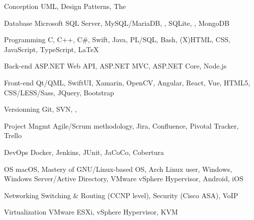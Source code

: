 

\begin{cvskills}

  \cvskill
    {Conception} %
    {UML, Design Patterns, The } %

  \cvskill
    {Database} %
    {Microsoft SQL Server, MySQL/MariaDB, , SQLite, , MongoDB} %

  \cvskill
    {Programming} %
    {C, C++, C\#, Swift, Java, PL/SQL, Bash, (X)HTML, CSS, JavaScript, TypeScript, \LaTeX} %

  \cvskill
    {Back-end} %
    {ASP.NET Web API, ASP.NET MVC, ASP.NET Core, Node.js} %

  \cvskill
    {Front-end} %
    {Qt/QML, SwiftUI, Xamarin, OpenCV, Angular, React, Vue, HTML5, CSS/LESS/Sass, JQuery, Bootstrap} %

  \cvskill
    {Versionning} %
    {Git, SVN, , } %

  \cvskill
    {Project Mngmt} %
    {Agile/Scrum methodology, Jira, Confluence, Pivotal Tracker, Trello} %

  \cvskill
    {DevOps} %
    {Docker, Jenkins, JUnit, JaCoCo, Cobertura} %

  \cvskill
    {OS} %
    {macOS, Mastery of GNU/Linux-based OS, Arch Linux user, Windows, Windows Server/Active Directory, VMware vSphere Hypervisor, Android, iOS} %

  \cvskill
    {Networking} %
    {Switching \& Routing (CCNP level), Security (Cisco ASA), VoIP} %

  \cvskill
    {Virtualization} %
    {VMware ESXi, vSphere Hypervisor, KVM} %


\end{cvskills}

